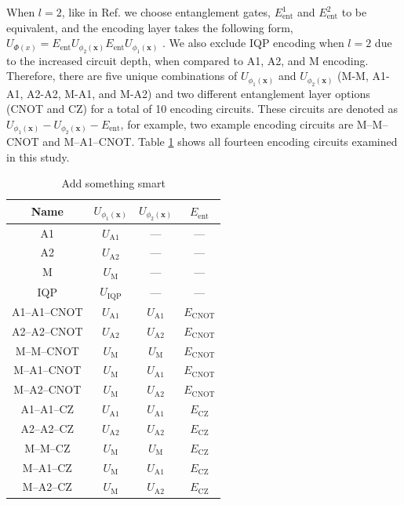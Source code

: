 \documentclass[journal=jacsat,manuscript=article]{achemso}
\begin{document}
  
When $l=2$, like in Ref. \citep{suzuki_predicting_2020} we choose entanglement gates, $E_{\text{ent}}^{1}$ and $E_{\text{ent}}^{2}$ to be equivalent, and the encoding layer takes the following form, $U_{\Phi(x)} =  E_{\text{ent}} U_{\phi_{2}(\mathbf{x})} E_{\text{ent}} U_{\phi_{1}(\mathbf{x})}$ .
We also exclude IQP encoding when $l=2$ due to the increased circuit depth, when compared to A1, A2, and M encoding.
Therefore, there are five unique combinations of $U_{\phi_{1}(\mathbf{x})}$ and $U_{\phi_{2}(\mathbf{x})}$ (M-M, A1-A1, A2-A2, M-A1, and M-A2) and two different entanglement layer options (CNOT and CZ) for a total of 10 encoding circuits. 
These circuits are denoted as $U_{\phi_{1}(\mathbf{x})}-U_{\phi_{2}(\mathbf{x})}-E_{\text{ent}}$, for example, two example encoding circuits are M--M--CNOT and M--A1--CNOT.
Table \ref{tab:encoders} shows all fourteen encoding circuits examined in this study.

\begin{table}[htbp]
	\centering
	\begin{tabular}{|c|c|c|c|}
		\hline
		\textbf{Name} & $U_{\phi_{1}(\mathbf{x})}$ & $U_{\phi_{2}(\mathbf{x})}$ & $E_{\text{ent}}$  \\
		\hline
		\hline
		A1 & $U_{\text{A1}}$ & --- & --- \\
		\hline
		A2 & $U_{\text{A2}}$ & --- & --- \\
		\hline		
		M & $U_{\text{M}}$ & --- & --- \\
		\hline
		IQP & $U_{\text{IQP}}$ & --- & --- \\
		\hline
		A1--A1--CNOT & $U_{\text{A1}}$ & $U_{\text{A1}}$ & $E_{\text{CNOT}}$ \\
		\hline
		 A2--A2--CNOT & $U_{\text{A2}}$ & $U_{\text{A2}}$ & $E_{\text{CNOT}}$ \\
		\hline
		M--M--CNOT & $U_{\text{M}}$ & $U_{\text{M}}$ & $E_{\text{CNOT}}$ \\
		\hline
		M--A1--CNOT & $U_{\text{M}}$ & $U_{\text{A1}}$ & $E_{\text{CNOT}}$ \\
		\hline		
		M--A2--CNOT & $U_{\text{M}}$ & $U_{\text{A2}}$ & $E_{\text{CNOT}}$ \\
		\hline				
		A1--A1--CZ & $U_{\text{A1}}$ & $U_{\text{A1}}$ & $E_{\text{CZ}}$ \\
		\hline
		A2--A2--CZ& $U_{\text{A2}}$ & $U_{\text{A2}}$ & $E_{\text{CZ}}$ \\
		\hline
		M--M--CZ & $U_{\text{M}}$ & $U_{\text{M}}$ & $E_{\text{CZ}}$ \\
		\hline
		M--A1--CZ & $U_{\text{M}}$ & $U_{\text{A1}}$ & $E_{\text{CZ}}$ \\
		\hline		
		M--A2--CZ & $U_{\text{M}}$ & $U_{\text{A2}}$ & $E_{\text{CZ}}$ \\
		\hline						
	\end{tabular}
	\caption{Add something smart}
	\label{tab:encoders}
\end{table}
\end{document}
